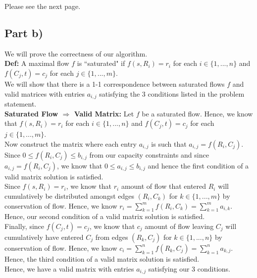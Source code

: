 \documentclass[12pt]{article}
\begin{document}
Please see the next page. 

\newpage

\subsection*{Part b)}

We will prove the correctness of our algorithm. \\

\textbf{Def:} A maximal flow $f$ is ``saturated" if $f(s, R_i) = r_i$ for each $i \in \{1,...,n\}$ and $f(C_j, t) = c_j$ for each $j \in \{1,...,m\}$. \\

We will show that there is a 1-1 correspondence between saturated flows $f$ and valid matrices with entries $a_{i,j}$ satisfying the 3 conditions listed in the problem statement. \\

\textbf{Saturated Flow $\Rightarrow$ Valid Matrix:} Let $f$ be a saturated flow. Hence, we know that $f(s, R_i) = r_i$ for each $i \in \{1,...,n\}$ and $f(C_j, t) = c_j$ for each $j \in \{1,...,m\}$. \\

Now construct the matrix where each entry $a_{i,j}$ is such that $a_{i,j} = f(R_i,C_j)$. \\

Since $0 \leq f(R_i,C_j) \leq b_{i,j}$ from our capacity constraints and since $a_{i,j} = f(R_i,C_j)$, we know that $0 \leq a_{i,j} \leq b_{i,j}$ and hence the first condition of a valid matrix solution is satisfied. \\

Since $f(s, R_i) = r_i$, we know that $r_i$ amount of flow that entered $R_i$ will cumulatively be distributed amongst edges $(R_i, C_k)$ for $k \in \{1,...,m\}$ by conservation of flow. Hence, we know $r_i = \sum_{k=1}^m f(R_i, C_k) = \sum_{k=1}^m a_{i,k}$. Hence, our second condition of a valid matrix solution is satisfied. \\

Finally, since $f(C_j, t) = c_j$, we know that $c_j$ amount of flow leaving $C_j$ will cumulatively have entered $C_j$ from edges $(R_k, C_j)$ for $k \in \{1,...,n\}$ by conservation of flow. Hence, we know $c_i = \sum_{k=1}^n f(R_k, C_j) = \sum_{k=1}^n a_{k,j}$. Hence, the third condition of a valid matrix solution is satisfied. \\

Hence, we have a valid matrix with entries $a_{i,j}$ satisfying our 3 conditions. \\
\end{document}
